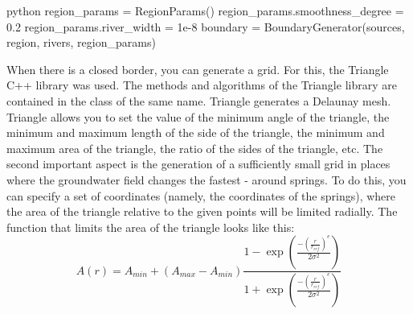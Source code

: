 \documentclass[]{pracamgr}
\begin{document}
      \begin{mintedbox}{python}
        region_params = RegionParams()
        region_params.smoothness_degree = 0.2
        region_params.river_width = 1e-8
        boundary = BoundaryGenerator(sources, region, rivers, region_params)\end{mintedbox}

      When there is a closed border, you can generate a grid. For this, the Triangle C++ library \cite{szewczuk1996triangle} was used. The methods and algorithms of the Triangle library are contained in the class of the same name. Triangle generates a Delaunay mesh. Triangle allows you to set the value of the minimum angle of the triangle, the minimum and maximum length of the side of the triangle, the minimum and maximum area of the triangle, the ratio of the sides of the triangle, etc. The second important aspect is the generation of a sufficiently small grid in places where the groundwater field changes the fastest - around springs. To do this, you can specify a set of coordinates (namely, the coordinates of the springs), where the area of the triangle relative to the given points will be limited radially. The function that limits the area of the triangle looks like this:
      \begin{equation}
        A(r) = A_{min} + (A_{max} - A_{min}) \frac{1 - \exp{(\frac{-(\frac{r}{r_{ref}})^{e}}{2 \sigma^2})}}{1 + \exp{(\frac{-(\frac{r}{r_{ref}})^{e}}{2 \sigma^2})}} 
      \end{equation}
\end{document}
